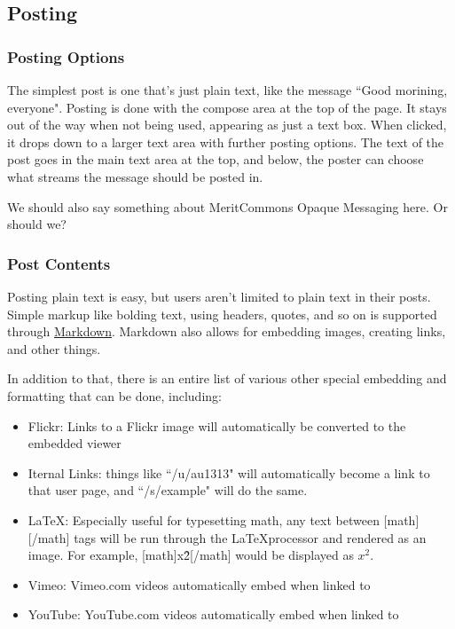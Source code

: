 \documentclass[titlepage]{article}
\newlength{\wideitemsep}
\let\olditem\item
\renewcommand{\item}{\setlength{\itemsep}{\wideitemsep}\olditem}
\begin{document}
\subsection{Posting}
\subsubsection{Posting Options}
The simplest post is one that's just plain text, like the message ``Good morining, everyone". Posting is done with the compose area at the top of the page. It stays out of the way when not being used, appearing as just a text box. When clicked, it drops down to a larger text area with further posting options. The text of the post goes in the main text area at the top, and below, the poster can choose what streams the message should be posted in.

We should also say something about MeritCommons Opaque Messaging here. Or should we?

\subsubsection{Post Contents}
Posting plain text is easy, but users aren't limited to plain text in their posts. Simple markup like bolding text, using headers, quotes, and so on is supported through \href{http://daringfireball.net/projects/markdown/syntax}{Markdown}. Markdown also allows for embedding images, creating links, and other things. 

In addition to that, there is an entire list of various other special embedding and formatting that can be done, including:
\begin{itemize}
\item Flickr: Links to a Flickr image will automatically be converted to the embedded viewer
\item Iternal Links: things like ``/u/au1313" will automatically become a link to that user page, and ``/s/example" will do the same.
\item \LaTeX: Especially useful for typesetting math, any text between [math][/math] tags will be run through the \LaTeX processor and rendered as an image. For example, [math]x\^2[/math] would be displayed as $x^2$.
\item Vimeo: Vimeo.com videos automatically embed when linked to
\item YouTube: YouTube.com videos automatically embed when linked to
\end{itemize}
















\newpage
\listoffigures

\glsaddall
\printglossaries
\end{document}
